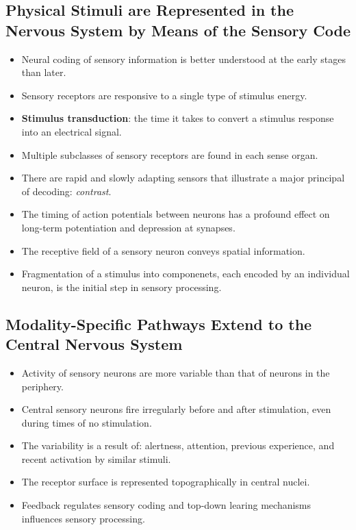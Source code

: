 \documentclass[12pt,a4paper]{article}
\begin{document}
\subsection{Physical Stimuli are Represented in the Nervous System by Means of the Sensory Code}
\begin{itemize}
    \item Neural coding of sensory information is better understood at the early stages than later.
    \item Sensory receptors are responsive to a single type of stimulus energy.
    \item \textbf{Stimulus transduction}: the time it takes to convert a stimulus response into an electrical signal.
    \item Multiple subclasses of sensory receptors are found in each sense organ.
    \item There are rapid and slowly adapting sensors that illustrate a major principal of decoding: \textit{contrast}.
    \item  The timing of action potentials between neurons has a profound effect on long-term potentiation and depression at synapses.
    \item The receptive field of a sensory neuron conveys spatial information.
    \item Fragmentation of a stimulus into componenets, each encoded by an individual neuron, is the initial step in sensory processing.
\end{itemize}

\subsection{Modality-Specific Pathways Extend to the Central Nervous System}
\begin{itemize}
    \item Activity of sensory neurons are more variable than that of neurons in the periphery.
    \item Central sensory neurons fire irregularly before and after stimulation, even during times of no stimulation.
    \item The variability is a result of: alertness, attention, previous experience, and recent activation by similar stimuli.
    \item The receptor surface is represented topographically in central nuclei.
    \item Feedback regulates sensory coding and top-down learing mechanisms influences sensory processing.
\end{itemize}
\end{document}
